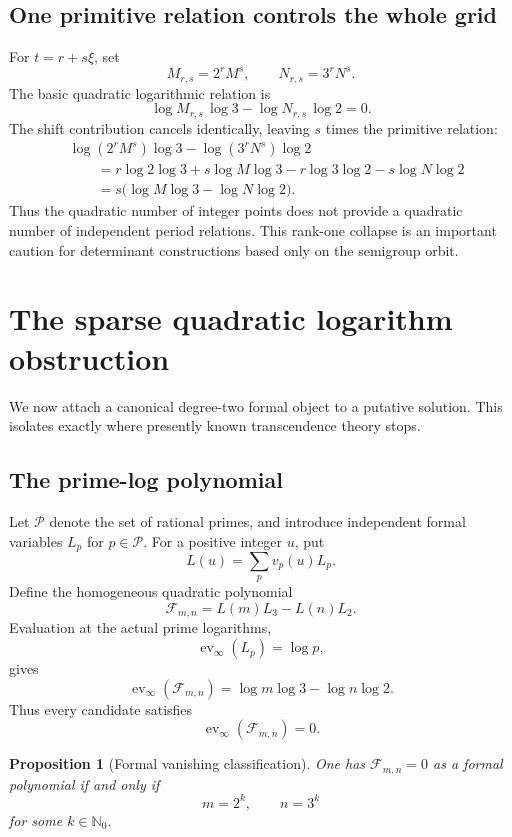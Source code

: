 \documentclass[11pt,oneside]{article}
\newtheorem{proposition}[theorem]{Proposition}
\theoremstyle{definition}
\newcommand{\N}{\mathbb N}
\begin{document}
\subsection{One primitive relation controls the whole grid}

For $t=r+s\xi$, set
\[
  M_{r,s}=2^rM^s,
  \qquad
  N_{r,s}=3^rN^s.
\]
The basic quadratic logarithmic relation is
\[
 \log M_{r,s}\,\log3-\log N_{r,s}\,\log2=0.
\]
The shift contribution cancels identically, leaving $s$ times the primitive relation:
\begin{align*}
 &\log(2^rM^s)\log3-\log(3^rN^s)\log2\\
 &\qquad=
 r\log2\log3+s\log M\log3
 -r\log3\log2-s\log N\log2\\
 &\qquad=s\bigl(\log M\log3-\log N\log2\bigr).
\end{align*}
Thus the quadratic number of integer points does not provide a quadratic number of independent period relations.  This rank-one collapse is an important caution for determinant constructions based only on the semigroup orbit.

\section{The sparse quadratic logarithm obstruction}

We now attach a canonical degree-two formal object to a putative solution.  This isolates exactly where presently known transcendence theory stops.

\subsection{The prime-log polynomial}

Let $\mathcal P$ denote the set of rational primes, and introduce independent formal variables $L_p$ for $p\in\mathcal P$.  For a positive integer $u$, put
\[
  L(u)=\sum_{p}v_p(u)L_p.
\]
Define the homogeneous quadratic polynomial
\begin{equation}\label{eq:formalF}
  \mathcal F_{m,n}=L(m)L_3-L(n)L_2.
\end{equation}
Evaluation at the actual prime logarithms,
\[
  \operatorname{ev}_\infty(L_p)=\log p,
\]
gives
\[
  \operatorname{ev}_\infty(\mathcal F_{m,n})
  =\log m\log3-\log n\log2.
\]
Thus every candidate satisfies
\[
  \operatorname{ev}_\infty(\mathcal F_{m,n})=0.
\]

\begin{proposition}[Formal vanishing classification]\label{prop:formalzero}
One has $\mathcal F_{m,n}=0$ as a formal polynomial if and only if
\[
  m=2^k,\qquad n=3^k
\]
for some $k\in\N_0$.
\end{proposition}
\end{document}
